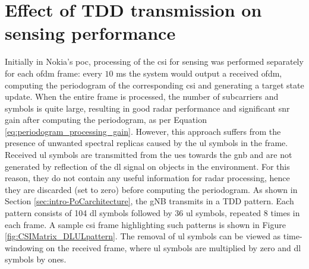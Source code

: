 \section{Effect of TDD transmission on sensing performance}
\label{sec:frame_sampling_strategies}
	Initially in Nokia's \gls{poc}, processing of the \gls{csi} for sensing was performed separately for each \gls{ofdm} frame: every $10$ ms the system would output a received \gls{ofdm}, computing the periodogram of the corresponding \gls{csi} and generating a target state update. When the entire frame is processed, the number of subcarriers and symbols is quite large, resulting in good radar performance and significant \gls{snr} gain after computing the periodogram, as per Equation \eqref{eq:periodogram_processing_gain}. However, this approach suffers from the presence of unwanted spectral replicas caused by the \gls{ul} symbols in the frame.
	Received \gls{ul} symbols are transmitted from the \glspl{ue} towards the \gls{gnb} and are not generated by reflection of the \gls{dl} signal on objects in the environment.
	For this reason, they do not contain any useful information for radar processing, hence they are discarded (set to zero) before computing the periodogram.
	As shown in Section \ref{sec:intro-PoCarchitecture}, the gNB transmits in a TDD pattern. Each pattern consists of 104 \gls{dl} symbols followed by 36 \gls{ul} symbols, repeated 8 times in each frame. A sample \gls{csi} frame highlighting such patterns is shown in Figure \ref{fig:CSIMatrix_DLULpattern}.
    The removal of \gls{ul} symbols can be viewed as time-windowing on the received frame, where \gls{ul} symbols are multiplied by zero and \gls{dl} symbols by ones.
        
